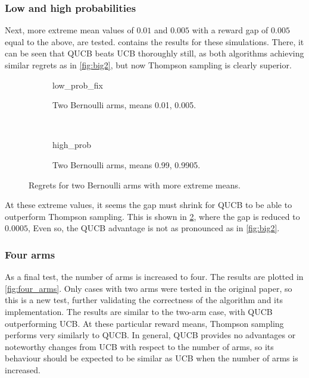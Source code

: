 \subsubsection{Low and high probabilities}
Next, more extreme mean values of $0.01$ and $0.005$ with a reward gap of $0.005$ equal to the above, are tested.
 contains the results for these simulations.
There, it can be seen that QUCB beats UCB thoroughly still, as both algorithms achieving similar regrets as in \cref{fig:big2}, but now Thompson sampling is clearly superior.


\begin{figure}
    \centering
    \begin{subfigure}{\textwidth}
        \centering
        \newcommand{\myoptions}{
            width=10cm,
            height=8cm,
            xlabel={Kiloturn},
            ylabel={Regret},
            legend entries={UCB, QUCB, Thompson},
            legend pos=north west,
            legend cell align=left,
            mystyle,
        }
        {low_prob_fix}
        \caption{Two Bernoulli arms, means 0.01, 0.005.}
        \label{fig:low_prob_fix}
    \end{subfigure}
    \\[3ex]
    \begin{subfigure}{\textwidth}
        \centering
        \newcommand{\myoptions}{
            width=10cm,
            height=8cm,
            xlabel={Kiloturn},
            ylabel={Regret},
            legend entries={UCB, QUCB, Thompson},
            legend pos=north west,
            legend cell align=left,
            mystyle,
        }
        {high_prob}
        \caption{Two Bernoulli arms, means 0.99, 0.9905.}
        \label{fig:high_prob}
    \end{subfigure}
    \label{fig:low_high_prob}
    \caption[
        Regrets for two Bernoulli arms with more extreme means.
    ]{
        Regrets for two Bernoulli arms with more extreme means.
    }
\end{figure}

At these extreme values, it seems the gap must shrink for QUCB to be able to outperform Thompson sampling.
This is shown in \cref{fig:high_prob}, where the gap is reduced to $0.0005$,
Even so, the QUCB advantage is not as pronounced as in \cref{fig:big2}.

\subsubsection{Four arms}
As a final test, the number of arms is increased to four.
The results are plotted in \cref{fig:four_arms}.
Only cases with two arms were tested in the original paper, so this is a new test, further validating the correctness of the algorithm and its implementation.
The results are similar to the two-arm case, with QUCB outperforming UCB.
At these particular reward means, Thompson sampling performs very similarly to QUCB.
In general, QUCB provides no advantages or noteworthy changes from UCB with respect to the number of arms, so its behaviour should be expected to be similar as UCB when the number of arms is increased.

